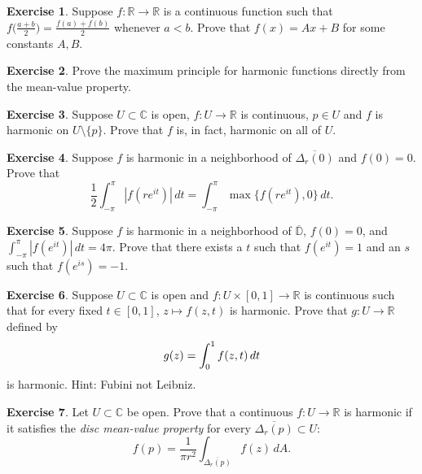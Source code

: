 \documentclass[12pt,openany]{book}
\newcommand{\avoidbreak}{\postdisplaypenalty=100}
\newcommand{\abs}[1]{\left\lvert {#1} \right\rvert}
\newcommand{\C}{{\mathbb{C}}}
\newcommand{\R}{{\mathbb{R}}}
\newcommand{\D}{{\mathbb{D}}}
\newcommand{\myindex}[1]{#1\index{#1}}
\theoremstyle{plain}
\theoremstyle{remark}
\theoremstyle{definition}
\newenvironment{exbox}{%
    \def\FrameCommand{\vrule width 1pt \relax\hspace{10pt}}%
    \MakeFramed{\advance\hsize-\width\FrameRestore}%
}{%
    \endMakeFramed
}
\theoremstyle{exercise}
\newtheorem{exercise}{Exercise}[section]
\theoremstyle{example}
\begin{document}
\begin{exbox}
\begin{exercise}
Suppose $f \colon \R \to \R$ is a continuous function such that
$f\bigl(\frac{a+b}{2}\bigr) = \frac{f(a)+f(b)}{2}$ whenever $a < b$.
Prove that $f(x) = Ax + B$ for some constants $A,B$.
\end{exercise}

\begin{exercise}
Prove the maximum principle for harmonic functions directly from the
mean-value property.
\end{exercise}

\begin{exercise}
Suppose $U \subset \C$ is open, $f \colon U \to \R$ is continuous, $p \in U$
and $f$ is harmonic on $U \setminus \{ p \}$.  Prove that $f$ is, in fact,
harmonic on all of $U$.
\end{exercise}

\begin{exercise}
Suppose $f$ is harmonic in a neighborhood of
$\overline{\Delta_r(0)}$ and
$f(0) = 0$.  Prove that
\begin{equation*}
\frac{1}{2} \int_{-\pi}^\pi \abs{f(re^{it})} \, dt = 
\int_{-\pi}^\pi \max \{ f(re^{it}), 0 \} \, dt .
\end{equation*}
\end{exercise}

\begin{exercise}
Suppose $f$ is harmonic in a neighborhood of
$\overline{\D}$, $f(0) = 0$, and $\int_{-\pi}^\pi \abs{f(e^{it})}\, dt =
4\pi$.
Prove that there exists a $t$ such that $f(e^{it}) = 1$ and an $s$ such that
$f(e^{is}) = -1$.
\end{exercise}

\begin{exercise}
Suppose $U \subset \C$ is open and
$f \colon U \times [0,1] \to \R$ is continuous
such that for every fixed $t \in [0,1]$, $z \mapsto f(z,t)$ is harmonic.
Prove that $g \colon U \to \R$ defined by
\begin{equation*}
g(z) = \int_0^1 f(z,t) \, dt
\avoidbreak
\end{equation*}
is harmonic.  Hint: Fubini not Leibniz.
\end{exercise}

\begin{exercise}
Let $U \subset \C$ be open.
Prove that a continuous $f \colon U \to \R$
is harmonic if it satisfies the
\emph{\myindex{disc mean-value property}} for every $\overline{\Delta_r(p)}
\subset U$:
\begin{equation*}
f(p) = 
\frac{1}{\pi r^2} \int_{\overline{\Delta_r(p)}} f(z) \, dA.
\end{equation*}
\end{exercise}


\end{exbox}
\end{document}
